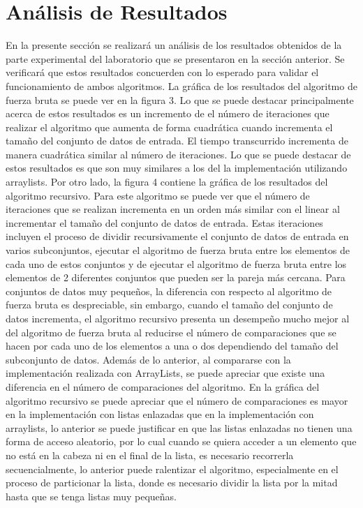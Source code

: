 \section{Análisis de Resultados}

En la presente sección se realizará un análisis de los resultados obtenidos de la parte experimental del laboratorio que se presentaron en la sección anterior. Se verificará que estos resultados concuerden con lo esperado para validar el funcionamiento de ambos algoritmos. La gráfica de los resultados del algoritmo de fuerza bruta se puede ver en la figura 3. Lo que se puede destacar principalmente acerca de estos resultados es un incremento de el número de iteraciones que realizar el algoritmo que aumenta de forma cuadrática cuando incrementa el tamaño del conjunto de datos de entrada. El tiempo transcurrido incrementa de manera cuadrática similar al número de iteraciones. Lo que se puede destacar de estos resultados es que son muy similares a los del la implementación utilizando arraylists. Por otro lado, la figura 4 contiene la gráfica de los resultados del algoritmo recursivo. Para este algoritmo se puede ver que el número de iteraciones que se realizan incrementa en un orden más similar con el linear al incrementar el tamaño del conjunto de datos de entrada. Estas iteraciones incluyen el proceso de dividir recursivamente el conjunto de datos de entrada en varios subconjuntos, ejecutar el algoritmo de fuerza bruta entre los elementos de cada uno de estos conjuntos y de ejecutar el algoritmo de fuerza bruta entre los elementos de 2 diferentes conjuntos que pueden ser la pareja más cercana. Para conjuntos de datos muy pequeños, la diferencia con respecto al algoritmo de fuerza bruta es despreciable, sin embargo, cuando el tamaño del conjunto de datos incrementa, el algoritmo recursivo presenta un desempeño mucho mejor al del algoritmo de fuerza bruta al reducirse el número de comparaciones que se hacen por cada uno de los elementos a una o dos dependiendo del tamaño del subconjunto de datos. Además de lo anterior, al compararse con la implementación realizada con ArrayLists, se puede apreciar que existe una diferencia en el número de comparaciones del algoritmo. En la gráfica del algoritmo recursivo se puede apreciar que el número de comparaciones es mayor en la implementación con listas enlazadas que en la implementación con arraylists, lo anterior se puede justificar en que las listas enlazadas no tienen una forma de acceso aleatorio, por lo cual cuando se quiera acceder a un elemento que no está en la cabeza ni en el final de la lista, es necesario recorrerla secuencialmente, lo anterior puede ralentizar el algoritmo, especialmente en el proceso de particionar la lista, donde es necesario dividir la lista por la mitad hasta que se tenga listas muy pequeñas.